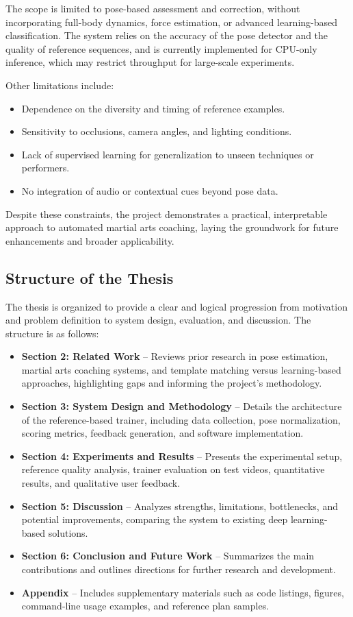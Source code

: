 \documentclass[12pt]{article}
\begin{document}
{The scope is limited to pose-based assessment and correction, without incorporating full-body dynamics, force estimation, or advanced learning-based classification. The system relies on the accuracy of the pose detector and the quality of reference sequences, and is currently implemented for CPU-only inference, which may restrict throughput for large-scale experiments.

Other limitations include:
\begin{itemize}
\item Dependence on the diversity and timing of reference examples.
\item Sensitivity to occlusions, camera angles, and lighting conditions.
\item Lack of supervised learning for generalization to unseen techniques or performers.
\item No integration of audio or contextual cues beyond pose data.
\end{itemize}

Despite these constraints, the project demonstrates a practical, interpretable approach to automated martial arts coaching, laying the groundwork for future enhancements and broader applicability.

\subsection{Structure of the Thesis}
The thesis is organized to provide a clear and logical progression from motivation and problem definition to system design, evaluation, and discussion. The structure is as follows:

\begin{itemize}
\item \textbf{Section 2: Related Work}  --  Reviews prior research in pose estimation, martial arts coaching systems, and template matching versus learning-based approaches, highlighting gaps and informing the project's methodology.
\item \textbf{Section 3: System Design and Methodology}  --  Details the architecture of the reference-based trainer, including data collection, pose normalization, scoring metrics, feedback generation, and software implementation.
\item \textbf{Section 4: Experiments and Results}  --  Presents the experimental setup, reference quality analysis, trainer evaluation on test videos, quantitative results, and qualitative user feedback.
\item \textbf{Section 5: Discussion}  --  Analyzes strengths, limitations, bottlenecks, and potential improvements, comparing the system to existing deep learning-based solutions.
\item \textbf{Section 6: Conclusion and Future Work}  --  Summarizes the main contributions and outlines directions for further research and development.
\item \textbf{Appendix}  --  Includes supplementary materials such as code listings, figures, command-line usage examples, and reference plan samples.
\end{itemize}

}
\end{document}
